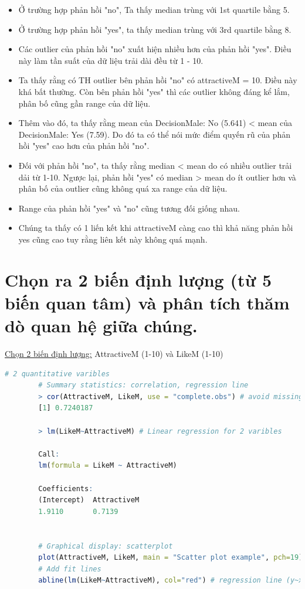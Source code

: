 \documentclass[a4paper,12pt]{article}
\begin{document}
	\begin{itemize}
		\item Ở trường hợp phản hồi "no", Ta thấy median trùng với 1st quartile bằng 5.
		\item Ở trường hợp phản hồi "yes", ta thấy median trùng với 3rd quartile bằng 8.
		\item Các outlier của phản hồi "no" xuất hiện nhiều hơn của phản hồi "yes". Điều này làm tần suất của dữ liệu trải dài đều từ 1 - 10.
		\item Ta thấy rằng có TH outlier bên phản hồi "no" có attractiveM = 10. Điều này khá bất thường. Còn bên phản hồi "yes" thì các outlier không đáng kể lắm, phân bố cũng gần range của dữ liệu.

		\item Thêm vào đó, ta thấy rằng mean của DecisionMale: No (5.641) < mean của DecisionMale: Yes (7.59). Do đó ta có thể nói mức điểm quyến rũ của phản hồi "yes" cao hơn của phản hồi "no".
		
		\item Đối với phản hồi "no", ta thấy rằng median < mean do có nhiều outlier trải dải từ 1-10. Ngược lại, phản hồi "yes" có median > mean do ít outlier hơn và phân bố của outlier cũng không quá xa range của dữ liệu.
		
		\item Range của phản hồi "yes" và "no" cũng tương đối giống nhau.
		
		\item Chúng ta thấy có 1 liến kết khi attractiveM càng cao thì khả năng phản hồi yes cũng cao tuy rằng liên kết này không quá mạnh.
	\end{itemize}
	
	\section{Chọn ra 2 biến định lượng (từ 5 biến quan tâm) và phân tích thăm dò quan hệ giữa chúng.}
	\underline{Chọn 2 biến định lượng:} AttractiveM (1-10) và LikeM (1-10)\\
	
	
	\begin{lstlisting}[language=R]
		# 2 quantitative varibles
		# Summary statistics: correlation, regression line
		> cor(AttractiveM, LikeM, use = "complete.obs") # avoid missing value NA
		[1] 0.7240187
		
		> lm(LikeM~AttractiveM) # Linear regression for 2 varibles
		
		Call:
		lm(formula = LikeM ~ AttractiveM)
		
		Coefficients:
		(Intercept)  AttractiveM  
		1.9110       0.7139
		
		
		# Graphical display: scatterplot
		plot(AttractiveM, LikeM, main = "Scatter plot example", pch=19)
		# Add fit lines
		abline(lm(LikeM~AttractiveM), col="red") # regression line (y~x)
	\end{lstlisting}
	
\end{document}
